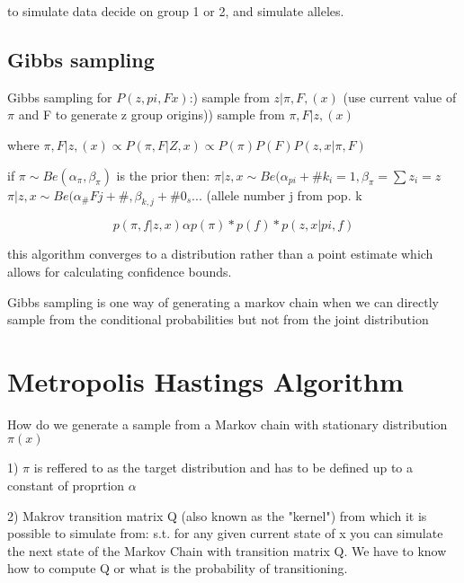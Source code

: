 \documentclass[12pt]{report}
\begin{document}
to simulate data decide on group 1 or 2, and simulate alleles.


\subsection{Gibbs sampling}

Gibbs sampling for $P(z, pi, Fx)$:) sample from $z|\pi,F,(x)$ (use current value of $\pi$ and F to generate z group origins)) sample from $\pi,F|z,(x)$ \newline

where $\pi,F|z,(x)\propto P(\pi,F|Z,x)\propto P(\pi)P(F)P(z,x|\pi,F)$

if $\pi \sim Be(\alpha_{\pi}, \beta_{\pi})$ is the prior then:\newline
$\pi|z,x \sim Be(\alpha_{pi}+\#k_i=1, \beta_{\pi}=\sum z_i=z$ \newline \newline
$\pi|z,x \sim Be(\alpha_\#Fj +\#{ }, \beta_{k,j} + \#{0_s ...}$ (allele number j from pop. k\newline
 
 \begin{equation}
 p(\pi, f|z,x) \alpha p(\pi)*p(f)*p(z,x|pi,f)
 \end{equation}
 
this algorithm converges to a distribution rather than a point estimate which allows for calculating confidence bounds. \newline

Gibbs sampling is one way of generating a markov chain when we can directly sample from the conditional probabilities but not from the joint distribution

\section{Metropolis Hastings Algorithm}
How do we generate a sample from a Markov chain with stationary distribution $\pi(x)$ \newline

1) $\pi$ is reffered to as the target distribution and has to be defined up to a constant of proprtion $\alpha$

2) Makrov transition matrix Q (also known as the "kernel") from which it is possible to simulate from:
s.t. for any given current state of x you can simulate the next state of the Markov Chain with transition matrix Q. We have to know how to compute Q or what is the probability of transitioning. 
\end{document}
